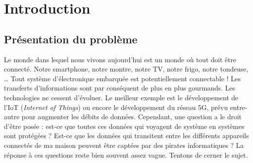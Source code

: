 \documentclass[oneside]{book}
\begin{document}
\tableofcontents
\newpage


\listoffigures
\newpage


\listoftables
\newpage
\strut
\thispagestyle{empty}
\newpage
{}



\chapter{Introduction}

\section{Présentation du problème}

Le monde dans lequel nous vivons aujourd’hui est un monde où tout doit être connecté. Notre smartphone, notre montre, notre TV, notre frigo, notre tondeuse, … Tout système d’électronique embarquée est potentiellement connectable ! Les transferts d’informations sont par conséquent de plus en plus gourmands. Les technologies ne cessent d’évoluer. Le meilleur exemple est le développement de l'IoT (\textit{Internet of Things}) ou encore le développement du réseau 5G, prévu entre-autre pour augmenter les débits de données. Cependant, une question a le droit d’être posée : est-ce que toutes ces données qui voyagent de système en systèmes sont protégées ? Est-ce que les données qui transitent entre les différents appareils connectés de ma maison peuvent être captées par des pirates informatiques ? La réponse à ces questions reste bien souvent assez vague. Tentons de cerner le sujet.
\end{document}

